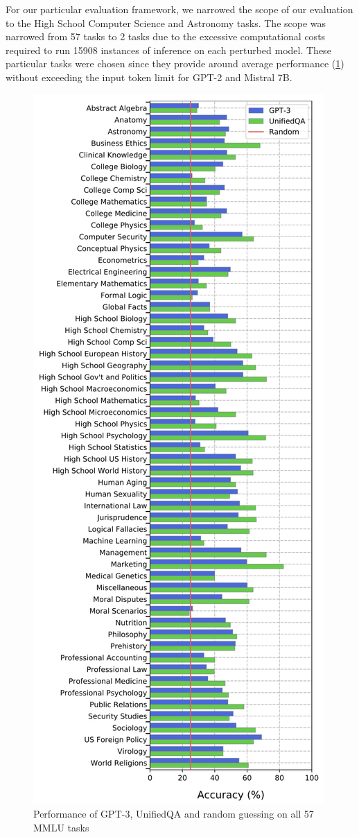 For our particular evaluation framework, we narrowed the scope of our evaluation to the High School Computer Science and Astronomy tasks. The scope was narrowed from 57 tasks to 2 tasks due to the excessive computational costs required to run 15908 instances of inference on each perturbed model. These particular tasks were chosen since they provide around average performance (\ref{fig:mmlu-tasks}) without exceeding the input token limit for GPT-2 and Mistral 7B.
\begin{figure}
        \centering
        \includegraphics[width=0.75\linewidth]{Course Project Template//images/mmlu-task-performance.png}
        \caption{Performance of GPT-3, UnifiedQA and random guessing on all 57 MMLU tasks\cite{hendrycks2021measuringmassivemultitasklanguage}}
        \label{fig:mmlu-tasks}
\end{figure}


